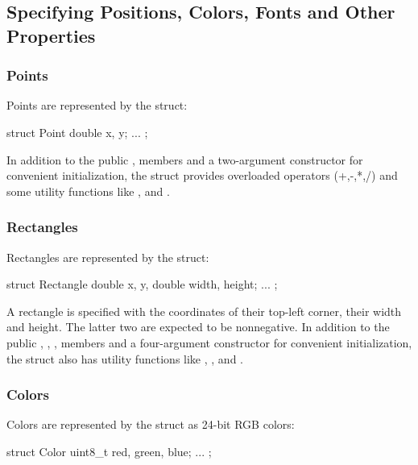 
\subsection{Specifying Positions, Colors, Fonts and Other Properties}

\subsubsection{Points}

Points are represented by the  struct:

\begin{cpp}
struct Point {
    double x, y;
    ...
};
\end{cpp}

In addition to the public ,  members and a two-argument
constructor for convenient initialization, the struct provides overloaded
operators (+,-,*,/) and some utility functions like ,
 and .

\subsubsection{Rectangles}

Rectangles are represented by the  struct:

\begin{cpp}
struct Rectangle {
    double x, y,
    double width, height;
    ...
};
\end{cpp}

A rectangle is specified with the coordinates of their top-left corner,
their width and height. The latter two are expected to be nonnegative. In
addition to the public , , ,  members
and a four-argument constructor for convenient initialization, the struct
also has utility functions like , ,
 and .

\subsubsection{Colors}

Colors are represented by the  struct as 24-bit RGB colors:

\begin{cpp}
struct Color {
    uint8_t red, green, blue;
    ...
};
\end{cpp}

